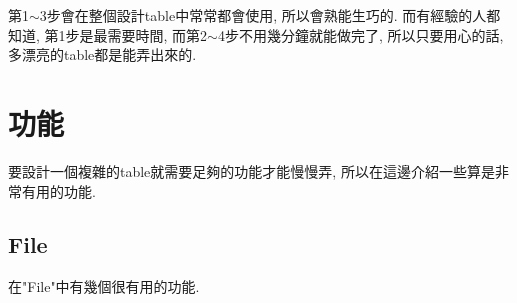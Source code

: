   第1$\sim$3步會在整個設計table中常常都會使用, 所以會熟能生巧的. 而有經驗的人都知道, 第1步是最需要時間, 而第2$\sim$4步不用幾分鐘就能做完了, 所以只要用心的話, 多漂亮的table都是能弄出來的.

\newpage
\section{功能}

要設計一個複雜的table就需要足夠的功能才能慢慢弄, 所以在這邊介紹一些算是非常有用的功能.

\subsection{File}

  在"File"中有幾個很有用的功能.


